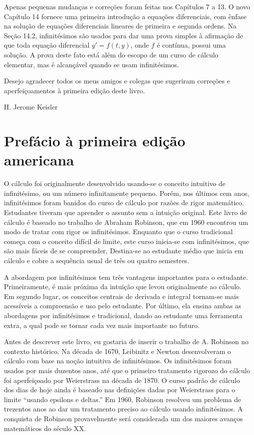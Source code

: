 \documentclass{svmono}
\begin{document}
Apenas pequenas mudanças e correções foram feitas nos Capítulos 7
a 13. O novo Capítulo 14 fornece uma primeira introdução a equações
diferenciais, com ênfase na solução de equações diferenciais lineares
de primeira e segunda ordens. Na Seção 14.2, infinitésimos são usados
para dar uma prova simples à afirmação de que toda equação diferencial
$y' = f(t,y)$, onde $f$ é contínua, possui uma solução. A prova deste
fato está além do escopo de um curso de cálculo elementar, mas é alcançável
quando se usam infinitésimos.

Desejo agradecer todos os meus amigos e colegas que sugeriram correções
e aperfeiçoamentos à primeira edição deste livro. 

\hfill H. Jerome Keisler

\chapter*{Prefácio à primeira edição americana}

O cálculo foi originalmente desenvolvido usando-se o conceito intuitivo
de infinitésimo, ou um número infinitamente pequeno. Porém, nos últimos
cem anos, infinitésimos foram banidos do curso de cálculo por razões de
rigor matemático. Estudantes tiveram que aprender o assunto sem a
intuição original. Este livro de cálculo é baseado no trabalho de
Abraham Robinson, que em 1960 encontrou um modo de tratar com rigor os
infinitésimos. Enquanto que o curso tradicional começa com o conceito
difícil de limite, este curso inicia-se com infinitésimos, que são mais
fáceis de se compreender. Destina-se ao estudante médio que inicia em
cálculo e cobre a sequência usual de três ou quatro semestres.

A abordagem por infinitésimos tem três vantagens importantes para o
estudante. Primeiramente, é mais próxima da intuição que levou originalmente
ao cálculo. Em segundo lugar, os conceitos centrais de derivada e integral
tornam-se mais acessíveis a compreensão e uso pelo estudante. Por último,
ela ensina ambas as abordagens por infinitésimos e tradicional, dando ao
estudante uma ferramenta extra, a qual pode se tornar cada vez mais
importante no futuro.

Antes de descrever este livro, eu gostaria de inserir o trabalho de A.
Robinson no contexto histórico. Na década de 1670, Leibinitz e Newton
desenvolveram o cálculo com base na noção intuitiva de infinitésimos.
Os infinitésimos foram usados por mais duzentos anos, até que o
primeiro tratamento rigorozo do cálculo foi aperfeiçoado por
Weierstrass na década de 1870. O curso padrão de cálculo dos dias
de hoje ainda é baseado nas definições dadas por Weierstrass para o limite
``usando epsilons e deltas.'' Em 1960, Robinson resolveu um
problema de trezentos anos ao dar um tratamento preciso ao cálculo
usando infinitésimos. A conquista de Robinson provavelmente será
considerada um dos maiores avanços matemáticos do século XX.
\end{document}
